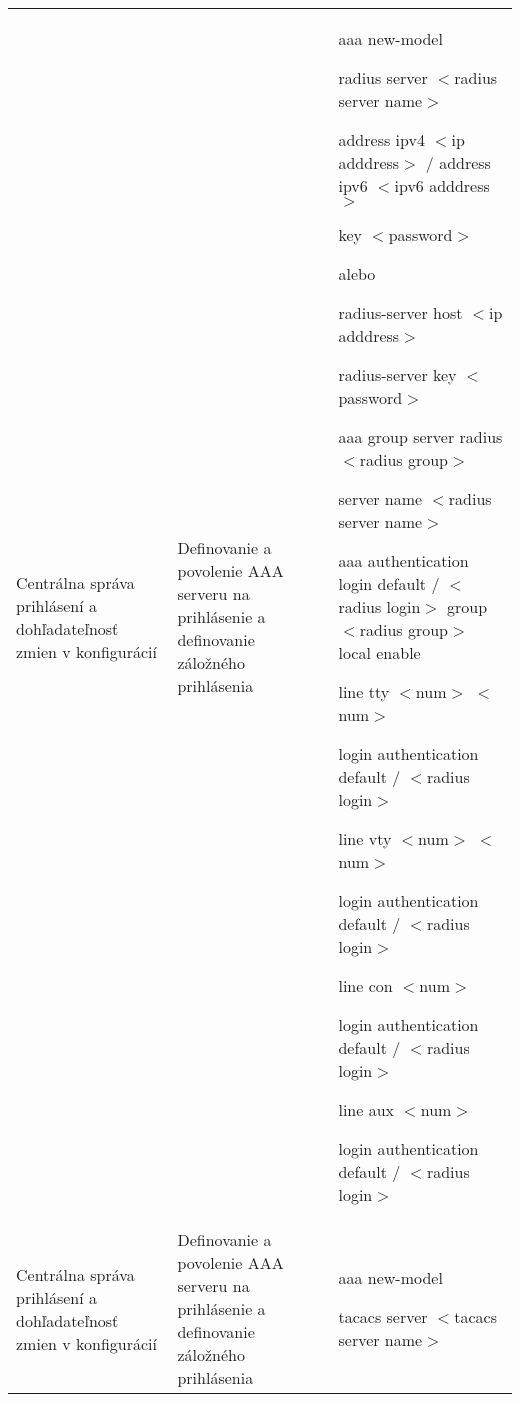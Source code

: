 \begin{longtable}[!htbp]{|L{10em}L{10em}L{34em}|}
	
	
	Centrálna správa prihlásení a dohľadateľnosť zmien v konfigurácií	&Definovanie a povolenie AAA serveru na prihlásenie a definovanie záložného prihlásenia	&aaa new-model
	
	radius server $<$radius server name$>$
	
	\hspace{0.5em}address ipv4 $<$ip adddress$>$ / address ipv6 $<$ipv6 adddress$>$
	
	\hspace{0.5em}key $<$password$>$
	\vspace{0.5em}
	
	alebo
	
	\vspace{0.5em}
	radius-server host $<$ip adddress$>$
	
	radius-server key $<$password$>$
	
	\vspace{0.5em}
	
	aaa group server radius $<$radius group$>$
	
	\hspace{0.5em}server name $<$radius server name$>$
	
	aaa authentication login default / $<$radius login$>$ group $<$radius group$>$ local enable
	
	line tty $<$num$>$ $<$num$>$
	
	\hspace{0.5em}login authentication default / $<$radius login$>$
	
	line vty $<$num$>$ $<$num$>$
	
	\hspace{0.5em}login authentication default / $<$radius login$>$
	
	line con $<$num$>$
	
	\hspace{0.5em}login authentication default / $<$radius login$>$
	
	line aux $<$num$>$
	
	
	\hspace{0.5em}login authentication default / $<$radius login$>$\\
	
	
	
	
	 Centrálna správa prihlásení a dohľadateľnosť zmien v konfigurácií	&Definovanie a povolenie AAA serveru na prihlásenie a definovanie záložného prihlásenia	&aaa new-model
	
	tacacs server $<$tacacs server name$>$
	

\end{longtable}
